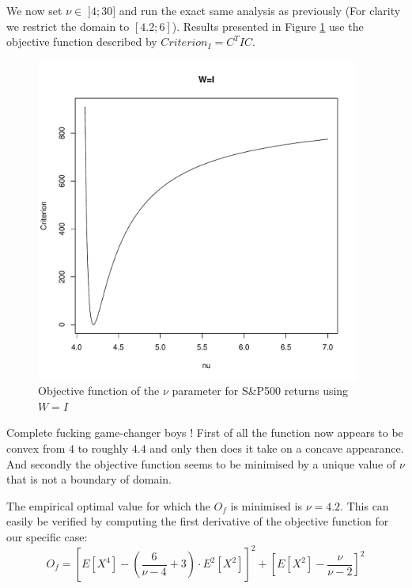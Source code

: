 We now set $\nu \in \; ]4;30]$ and run the exact same analysis as previously (For clarity we restrict the domain to $[4.2;6]$). Results presented in Figure \ref{ConcavitySPI} use the objective function described by $Criterion_I = C^T I C$.
\begin{figure}
    \centering
    \includegraphics[width=0.95\textwidth]{ConcavityS&PI.pdf}
    \caption{Objective function of the $\nu$ parameter for S\&P500 returns using $W=I$}
    \label{ConcavitySPI}
\end{figure}
\par
Complete fucking game-changer boys ! First of all the function now appears to be convex from $4$ to roughly $4.4$ and only then does it take on a concave appearance. And secondly the objective function seems to be minimised by a unique value of $\nu$ that is not a boundary of domain.
\par
The empirical optimal value for which the $O_f$ is minimised is $\nu=4.2$. 
This can easily be verified by computing the first derivative of the objective function for our specific case:
\begin{equation}\label{ObjectiveFunction_I}
    O_f = \left[E\left[X^4\right] - \left(\frac{6}{\nu-4}+3\right)\cdot         
                E^2\left[X^2\right]\right]^2 +
            \left[E\left[X^2\right] - \frac{\nu}{\nu - 2}\right]^2
\end{equation}

